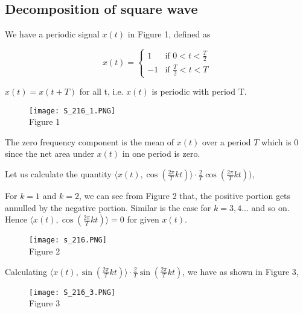 \noindent
\subsection{Decomposition of square wave}
We have a periodic signal $x(t)$ in Figure 1, defined as

\[
x(t) =
\left\{
	\begin{array}{ll}
		1  & \mbox{if } 0 < t < \frac{T}{2} \\
		-1 & \mbox{if } \frac{T}{2} < t < T
	\end{array}
\right.
 \]

\noindent
$x(t) = x(t+T)$ for all t, i.e. $x(t)$ is periodic with period T.
              
\begin{figure}[ht]
\centering
\texttt{[image: S\_216\_1.PNG]} \\Figure 1
\end{figure}




\noindent
The zero frequency component is the  mean of $x(t)$ over a period $T$ which is $0$ since the net area under $x(t)$ in one period is zero.

\noindent
Let us calculate the quantity $\langle x(t), \cos (\frac{2\pi}{T}kt)\rangle \cdot \frac{2}{T}\cos (\frac{2\pi}{T}kt))$,


\noindent
For $k=1$ and $k=2$, we can see from Figure 2 that, the positive portion gets annulled by the negative portion. Similar is the case for $k=3, 4...$ and so on. Hence $\langle x(t), \cos (\frac{2\pi}{T}kt)\rangle= 0$ for given $x(t)$.


\begin{figure}[ht]
\centering
\texttt{[image: s\_216.PNG]} \\Figure 2		
\end{figure}

\noindent
Calculating  $\langle x(t), \sin (\frac{2\pi}{T}kt)\rangle \cdot \frac{2}{T}\sin (\frac{2\pi}{T}kt)$, we have as shown in Figure 3,

\begin{figure}[ht]
\centering
\texttt{[image: S\_216\_3.PNG]} \\Figure 3		
\end{figure}


